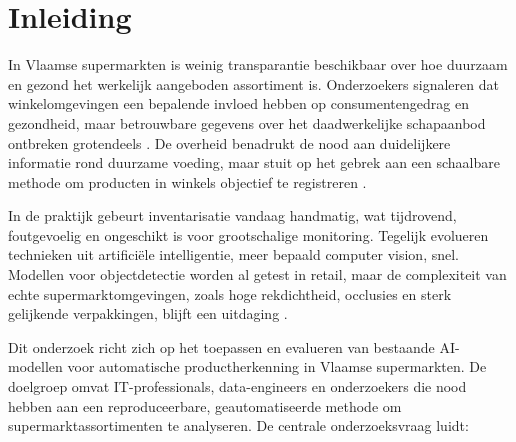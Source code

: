 


% 

\section{Inleiding}%
\label{sec:inleiding}

In Vlaamse supermarkten is weinig transparantie beschikbaar over hoe duurzaam en gezond het werkelijk aangeboden assortiment is. Onderzoekers signaleren dat winkelomgevingen een bepalende invloed hebben op consumentengedrag en gezondheid, maar betrouwbare gegevens over het daadwerkelijke schapaanbod ontbreken grotendeels \autocite{wur2025, rug2024}. De overheid benadrukt de nood aan duidelijkere informatie rond duurzame voeding, maar stuit op het gebrek aan een schaalbare methode om producten in winkels objectief te registreren \autocite{rvo2025}.

In de praktijk gebeurt inventarisatie vandaag handmatig, wat tijdrovend, foutgevoelig en ongeschikt is voor grootschalige monitoring. Tegelijk evolueren technieken uit artificiële intelligentie, meer bepaald computer vision, snel. Modellen voor objectdetectie worden al getest in retail, maar de complexiteit van echte supermarktomgevingen, zoals hoge rekdichtheid, occlusies en sterk gelijkende verpakkingen, blijft een uitdaging \autocite{santra2019, fuchs2019}.

Dit onderzoek richt zich op het toepassen en evalueren van bestaande AI-modellen voor automatische productherkenning in Vlaamse supermarkten. De doelgroep omvat IT-professionals, data-engineers en onderzoekers die nood hebben aan een reproduceerbare, geautomatiseerde methode om supermarktassortimenten te analyseren. De centrale onderzoeksvraag luidt:

